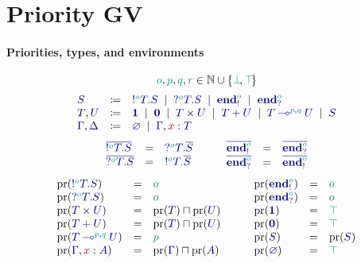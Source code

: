\documentclass[main.tex]{subfiles}
\begin{document}
\section{Priority GV}

\paragraph*{Priorities, types, and environments}
\[
  \cs{o}, \cs{p}, \cs{q}, \cs{r} \in \mathbb{N}\cup\{\cs{\pbot},\cs{\ptop}\}
\]
\[
\begin{array}{lcl}
  \ty{S}
  & \coloneqq & \ty{\tysend[\cs{o}]{T}{S}}
    \sep        \ty{\tyrecv[\cs{o}]{T}{S}}
    \sep        \ty{\tyends[\cs{o}]}
    \sep        \ty{\tyendr[\cs{o}]}
  \\
  \ty{T}, \ty{U}
  & \coloneqq & \ty{\tyunit}
    \sep        \ty{\tyvoid}
    \sep        \ty{\typrod{T}{U}}
    \sep        \ty{\tysum{T}{U}}
    \sep        \ty{\tylolli[\cs{p},\cs{q}]{T}{U}}
    \sep        \ty{S}
  \\
  \ty{\Gamma}, \ty{\Delta}
  & \coloneqq & \ty{\emptyenv}
    \sep        \ty{\Gamma}, \tmty{x}{T}
\end{array}
\]
\[
\begin{array}{lcl}
  \ty{\co{\tysend[\cs{o}]{T}{S}}} & = & \ty{\tyrecv[\cs{o}]{T}{\co{S}}} \\
  \ty{\co{\tyrecv[\cs{o}]{T}{S}}} & = & \ty{\tysend[\cs{o}]{T}{\co{S}}}
\end{array}
\qquad
\begin{array}{lcl}
  \ty{\co{\tyends[\cs{o}]}} & = & \ty{\co{\tyendr[\cs{o}]}} \\
  \ty{\co{\tyendr[\cs{o}]}} & = & \ty{\co{\tyends[\cs{o}]}}
\end{array}
\]
\[
\begin{array}{lcl}
  \pr(\ty{\tysend[\cs{o}]{T}{S}}) & = & \cs{o} \\
  \pr(\ty{\tyrecv[\cs{o}]{T}{S}}) & = & \cs{o} \\
  \pr(\ty{\typrod{T}{U}}) & = & \pr({\ty{T}})\sqcap\pr({\ty{U}}) \\
  \pr(\ty{\tysum{T}{U}})  & = & \pr({\ty{T}})\sqcap\pr({\ty{U}}) \\
  \pr(\ty{\tylolli[\cs{p},\cs{q}]{T}{U}}) & = & \cs{p} \\
  \pr(\ty{\Gamma}, \tmty{x}{A}) & = & \pr(\ty{\Gamma})\sqcap\pr(\ty{A})
\end{array}
\qquad
\begin{array}{lcl}
  \pr(\ty{\tyends[\cs{o}]}) & = & \cs{o} \\
  \pr(\ty{\tyendr[\cs{o}]}) & = & \cs{o} \\
  \pr(\ty{\tyunit})         & = & \ptop \\
  \pr(\ty{\tyvoid})         & = & \ptop \\
  \pr(\ty{S})               & = & \pr(\ty{S}) \\
  \pr(\ty{\emptyenv})       & = & \ptop
\end{array}
\]
\end{document}
